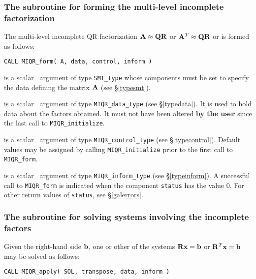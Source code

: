 \documentclass{galahad}
\newcommand{\packagename}{MIQR}
\begin{document}

\subsubsection{The subroutine for forming the multi-level incomplete factorization}
The multi-level incomplete QR factorization ${\mathbf{A}} \approx {\mathbf{Q}} {\mathbf{R}}$ or
${\mathbf{A}}^T \approx {\mathbf{Q}} {\mathbf{R}}$ or is formed as follows:
\vspace*{1mm}

\hspace{8mm}
{\tt CALL \packagename\_form(  A, data, control, inform )}

\vspace*{-3mm}
\begin{description}
 is a scalar \intentin\ argument of type {\tt SMT\_type} whose
components must be set to specify the data defining the matrix ${\mathbf{A}}$
(see \S\ref{typesmt}).

 is a scalar \intentinout\ argument of type
{\tt \packagename\_data\_type}
(see \S\ref{typedata}). It is used to hold data about the factors obtained.
It must not have been altered {\bf by the user} since the last call to
{\tt \packagename\_initialize}.

 is a scalar \intentin\ argument of type
{\tt \packagename\_control\_type}
(see \S\ref{typecontrol}). Default values may be assigned by calling
{\tt \packagename\_initialize} prior to the first call to
{\tt \packagename\_form}.

 is a scalar \intentout\ argument of type
{\tt \packagename\_inform\_type}
(see \S\ref{typeinform}). A successful call to
{\tt \packagename\_form}
is indicated when the  component {\tt status} has the value 0.
For other return values of {\tt status}, see \S\ref{galerrors}.

\end{description}


\subsubsection{The subroutine for solving systems involving the incomplete
factors}
Given the right-hand side ${\mathbf{b}}$, one or other of the systems
${\mathbf{R}} {\mathbf{x}} = {\mathbf{b}}$ or ${\mathbf{R}}^T {\mathbf{x}} = {\mathbf{b}}$ may be solved as follows:
\vspace*{1mm}

\hspace{8mm}
{\tt CALL \packagename\_apply(  SOL, transpose, data, inform )}
\end{document}
